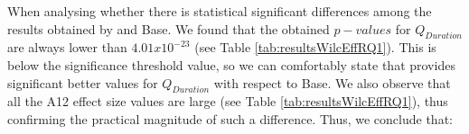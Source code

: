 \begin{table}[tb]
\centering
\caption{RQ1-RQ2. Mean values and standard deviations for $Q_{Duration}$ for each approach per Host and Overall.}
\label{tab:resultsMeanStDevRQ12}
\end{table}


When analysing whether there is statistical significant differences among the results obtained by \simhotep{} and Base. We found that the obtained $p-values$ for $Q_{Duration}$ are always lower than $4.01x10^{-23}$  (see Table \ref{tab:resultsWilcEffRQ1}). This is below the significance threshold value, so we can comfortably state that \simhotep{} provides significant better values for $Q_{Duration}$ with respect to Base. We also observe that all the  A12 effect size values are large (see Table \ref{tab:resultsWilcEffRQ1}), thus confirming the practical magnitude of such a difference. Thus, we conclude that:

